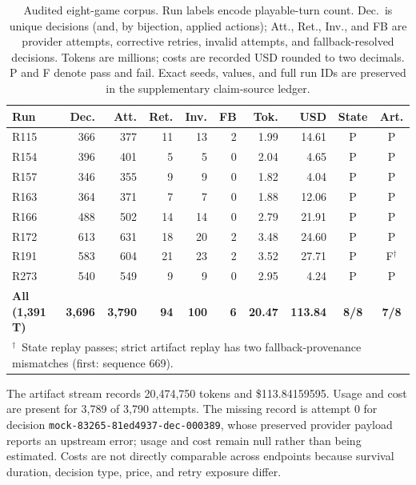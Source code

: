 \documentclass[conference]{IEEEtran}
\newcommand{\runid}[1]{\nolinkurl{#1}}
\begin{document}
\begin{table}[t]
\caption{Audited eight-game corpus. Run labels encode playable-turn count.
Dec.\ is unique decisions (and, by bijection, applied actions); Att., Ret.,
Inv., and FB are provider attempts, corrective retries, invalid attempts, and
fallback-resolved decisions. Tokens are millions; costs are recorded USD
rounded to two decimals. P and F denote pass and fail. Exact seeds, values, and
full run IDs are preserved in the supplementary claim-source ledger.}
\label{tab:corpus}
\centering
\footnotesize
\setlength{\tabcolsep}{3.3pt}
\begin{tabular}{lrrrrrrrcc}
\toprule
\textbf{Run} & \textbf{Dec.} & \textbf{Att.} & \textbf{Ret.} &
\textbf{Inv.} & \textbf{FB} & \textbf{Tok.} & \textbf{USD} &
\textbf{State} & \textbf{Art.} \\
\midrule
R115 & 366 & 377 & 11 & 13 & 2 & 1.99 & 14.61 & P & P \\
R154 & 396 & 401 &  5 &  5 & 0 & 2.04 &  4.65 & P & P \\
R157 & 346 & 355 &  9 &  9 & 0 & 1.82 &  4.04 & P & P \\
R163 & 364 & 371 &  7 &  7 & 0 & 1.88 & 12.06 & P & P \\
R166 & 488 & 502 & 14 & 14 & 0 & 2.79 & 21.91 & P & P \\
R172 & 613 & 631 & 18 & 20 & 2 & 3.48 & 24.60 & P & P \\
R191 & 583 & 604 & 21 & 23 & 2 & 3.52 & 27.71 & P & F$^\dagger$ \\
R273 & 540 & 549 &  9 &  9 & 0 & 2.95 &  4.24 & P & P \\
\midrule
\textbf{All (1,391 T)} & \textbf{3,696} & \textbf{3,790} &
\textbf{94} & \textbf{100} & \textbf{6} & \textbf{20.47} &
\textbf{113.84} & \textbf{8/8} & \textbf{7/8} \\
\bottomrule
\multicolumn{10}{l}{\footnotesize $^\dagger$~State replay passes; strict
artifact replay has two fallback-provenance mismatches (first: sequence 669).}
\end{tabular}
\end{table}

The artifact stream records 20,474,750 tokens and \$113.84159595. Usage and
cost are present for 3,789 of 3,790 attempts. The missing record is attempt 0
for decision \runid{mock-83265-81ed4937-dec-000389}, whose preserved provider
payload reports an upstream error; usage and cost remain null rather than
being estimated. Costs are not directly comparable across endpoints because
survival duration, decision type, price, and retry exposure differ.
\end{document}
